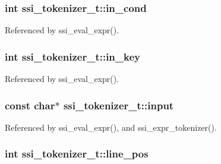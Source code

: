 \hypertarget{structssi__tokenizer__t_a93046475ccb0bb6e558b0e3263ac3d05}{
\subsubsection[{in\-\_\-cond}]{\setlength{\rightskip}{0pt plus 5cm}int ssi\-\_\-tokenizer\-\_\-t\-::in\-\_\-cond}}\label{structssi__tokenizer__t_a93046475ccb0bb6e558b0e3263ac3d05}


Referenced by ssi\-\_\-eval\-\_\-expr().

\hypertarget{structssi__tokenizer__t_a0e0825859d295df9c18103821d9b8637}{
\subsubsection[{in\-\_\-key}]{\setlength{\rightskip}{0pt plus 5cm}int ssi\-\_\-tokenizer\-\_\-t\-::in\-\_\-key}}\label{structssi__tokenizer__t_a0e0825859d295df9c18103821d9b8637}


Referenced by ssi\-\_\-eval\-\_\-expr().

\hypertarget{structssi__tokenizer__t_a56516bdc99535dd2996f82cf10bffad9}{
\subsubsection[{input}]{\setlength{\rightskip}{0pt plus 5cm}const char$\ast$ ssi\-\_\-tokenizer\-\_\-t\-::input}}\label{structssi__tokenizer__t_a56516bdc99535dd2996f82cf10bffad9}


Referenced by ssi\-\_\-eval\-\_\-expr(), and ssi\-\_\-expr\-\_\-tokenizer().

\hypertarget{structssi__tokenizer__t_a701d642a84e2e98909fb44c570994b87}{
\subsubsection[{line\-\_\-pos}]{\setlength{\rightskip}{0pt plus 5cm}int ssi\-\_\-tokenizer\-\_\-t\-::line\-\_\-pos}}\label{structssi__tokenizer__t_a701d642a84e2e98909fb44c570994b87}


